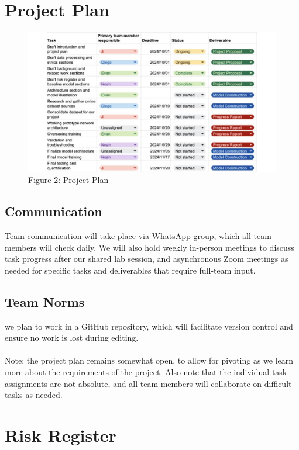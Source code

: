 \documentclass{article} %
\begin{document}
\section{Project Plan}
\label{project_plan}

\begin{figure}[H]
    \begin{center}
    \includegraphics[width=\textwidth]{Figs/project-plan.jpg}
    \end{center}
    \caption{Figure 2: Project Plan}
    \end{figure}

\subsection{Communication}
Team communication will take place via WhatsApp group, which all team members will check daily. We will also hold weekly in-person meetings to discuss task progress after our shared lab session, and asynchronous Zoom meetings as needed for specific tasks and deliverables that require full-team input.

\subsection{Team Norms}
we plan to work in a GitHub repository, which will facilitate version control and ensure no work is lost during editing.\\\\ 
Note: the project plan remains somewhat open, to allow for pivoting as we learn more about the requirements of the project. Also note that the individual task assignments are not absolute, and all team members will collaborate on difficult tasks as needed.


\section{Risk Register}
\label{risk_register}
\end{document}
